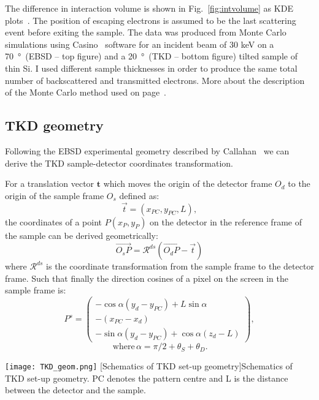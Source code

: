 The difference in interaction volume is shown in Fig.~\ref{fig:intvolume} as KDE plots~\cite{KDE}. The position of escaping electrons is assumed to be the last scattering event before exiting the sample.  The data was produced from Monte Carlo simulations using Casino~\cite{casino} software for an incident beam of 30 keV on a \SI{70}{\degree}~(EBSD -- top figure) and a \SI{20}{\degree}~(TKD -- bottom figure) tilted sample of thin Si. I used different sample thicknesses in order to produce the same total number of backscattered and transmitted electrons. More about the description of the Monte Carlo method used on page~\pageref{sec:MC}.







\subsection{TKD geometry}

Following the EBSD experimental geometry described by Callahan~\cite{degraef2013e} we can derive the TKD sample-detector coordinates transformation.


\noindent \begin{minipage}{0.55\textwidth}
\vspace{0.5cm}
For a translation vector $\textbf{t}$ which moves the origin of the detector frame $O_d$ to the origin of the sample frame $O_s$ defined as:
\begin{equation*}
    \vec{t}=(x_{PC}, y_{PC}, L),
\end{equation*}
the coordinates of a point $P(x_P, y_P)$ on the detector in the reference frame of the sample can be derived geometrically:
\begin{equation*}
   \vec{O_sP} = \mathcal{R}^{ds}(\vec{O_dP} -\vec{t})
\end{equation*}
where   $\mathcal{R}^{ds}$    is the coordinate transformation from the sample frame to the detector frame. Such that finally the direction cosines of a pixel on the screen in the sample frame is:
\begin{equation*}
    P^s=\begin{pmatrix}
    -\cos{\alpha}(y_d-y_{PC}) + L \sin{\alpha}   \\
    -(x_{PC}-x_d)\\
    -\sin{\alpha}(y_d-y_{PC}) + \cos{\alpha}(z_d-L)  
    \end{pmatrix}, 
\end{equation*}
\begin{equation*}
     \, \text{where} \,\alpha =\pi/2 + \theta_S + \theta_D.   
\end{equation*}    
\end{minipage}
\begin{minipage}{0.45\textwidth}
    \centering
\texttt{[image: TKD\_geom.png]}
\captionsetup{width=0.7\linewidth}
[Schematics of TKD set-up geometry]{Schematics of TKD set-up geometry. PC denotes the pattern centre and L is the distance between the detector and the sample.} 
\label{fig:TKDgeometry}
\end{minipage}

